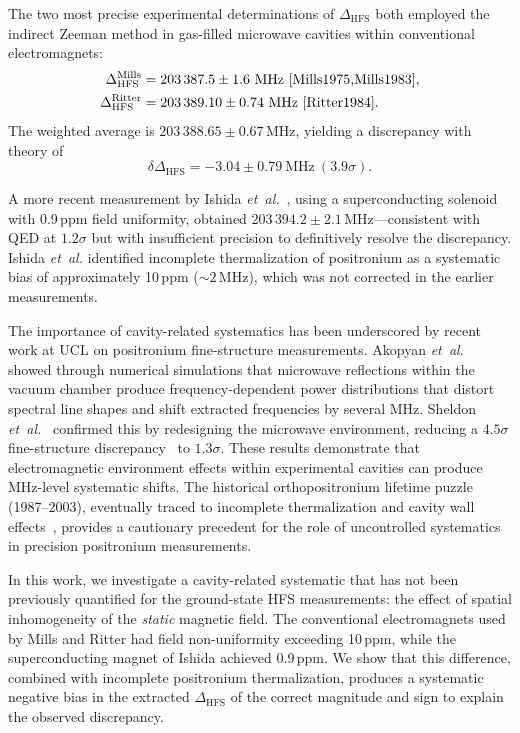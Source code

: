 \documentclass[twocolumn,pra,aps,superscriptaddress,floatfix,10pt]{revtex4-2}
\begin{document}
The two most precise experimental determinations of $\Delta_\mathrm{HFS}$ both employed the indirect Zeeman method in gas-filled microwave cavities within conventional electromagnets:
\begin{align}
  \Delta_\mathrm{HFS}^\mathrm{Mills} &= 203\,387.5 \pm 1.6~\mathrm{MHz}~\cite{Mills1975,Mills1983}, \\
  \Delta_\mathrm{HFS}^\mathrm{Ritter} &= 203\,389.10 \pm 0.74~\mathrm{MHz}~\cite{Ritter1984}.
\end{align}
The weighted average is $203\,388.65 \pm 0.67$\,MHz, yielding a discrepancy with theory of
\begin{equation}
  \delta\Delta_\mathrm{HFS} = -3.04 \pm 0.79~\mathrm{MHz}~(3.9\sigma).
  \label{eq:discrepancy}
\end{equation}

A more recent measurement by Ishida \textit{et~al.}~\cite{Ishida2014}, using a superconducting solenoid with 0.9\,ppm field uniformity, obtained $203\,394.2 \pm 2.1$\,MHz---consistent with QED at $1.2\sigma$ but with insufficient precision to definitively resolve the discrepancy. Ishida \textit{et~al.} identified incomplete thermalization of positronium as a systematic bias of approximately 10\,ppm ($\sim 2$\,MHz), which was not corrected in the earlier measurements.

The importance of cavity-related systematics has been underscored by recent work at UCL on positronium fine-structure measurements. Akopyan \textit{et~al.}~\cite{Akopyan2021} showed through numerical simulations that microwave reflections within the vacuum chamber produce frequency-dependent power distributions that distort spectral line shapes and shift extracted frequencies by several MHz. Sheldon \textit{et~al.}~\cite{Sheldon2023} confirmed this by redesigning the microwave environment, reducing a $4.5\sigma$ fine-structure discrepancy~\cite{Gurung2020} to $1.3\sigma$. These results demonstrate that electromagnetic environment effects within experimental cavities can produce MHz-level systematic shifts. The historical orthopositronium lifetime puzzle (1987--2003), eventually traced to incomplete thermalization and cavity wall effects~\cite{Vallery2003}, provides a cautionary precedent for the role of uncontrolled systematics in precision positronium measurements.

In this work, we investigate a cavity-related systematic that has not been previously quantified for the ground-state HFS measurements: the effect of spatial inhomogeneity of the \emph{static} magnetic field. The conventional electromagnets used by Mills and Ritter had field non-uniformity exceeding 10\,ppm, while the superconducting magnet of Ishida achieved 0.9\,ppm. We show that this difference, combined with incomplete positronium thermalization, produces a systematic negative bias in the extracted $\Delta_\mathrm{HFS}$ of the correct magnitude and sign to explain the observed discrepancy.
\end{document}
